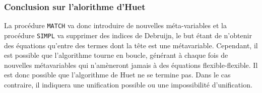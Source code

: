 \subsubsection{Conclusion sur l'alorithme d'Huet}
La procédure \verb?MATCH? va donc introduire de nouvelles méta-variables et la procédure \verb?SIMPL? va supprimer des indices de Debruijn, le but étant de n'obtenir des équations qu'entre des termes dont la tête est une métavariable. Cependant, il est possible que l'algorithme tourne en boucle, générant à chaque fois de nouvelles métavariables qui n'amèneront jamais à des équations flexible-flexible. Il est donc possible que l'algorithme de Huet ne se termine pas. Dans le cas contraire, il indiquera une unification possible ou une impossibilité d'unification.